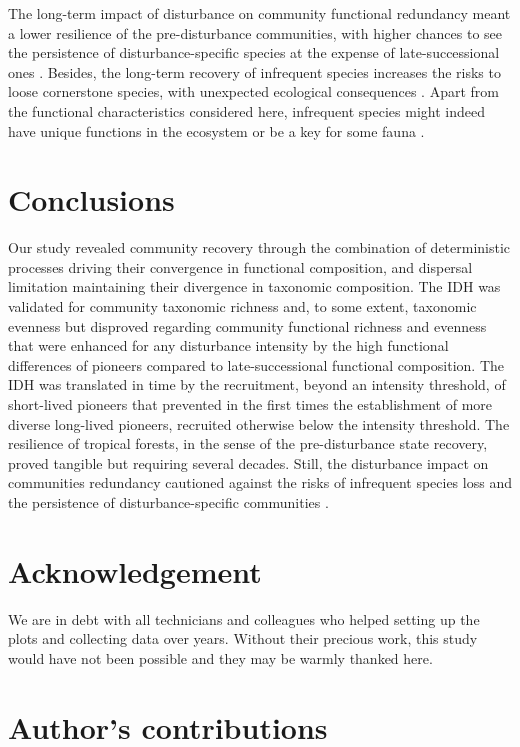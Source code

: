 \documentclass[fleqn,10pt]{ArtEcoFoG} %
\begin{document}
The long-term impact of disturbance on community functional redundancy
meant a lower resilience of the pre-disturbance communities, with higher
chances to see the persistence of disturbance-specific species at the
expense of late-successional ones \citep{Haddad2008}. Besides, the
long-term recovery of infrequent species increases the risks to loose
cornerstone species, with unexpected ecological consequences
\citep{Jones1994, Chazdon2003a, Diaz2005}. Apart from the functional
characteristics considered here, infrequent species might indeed have
unique functions in the ecosystem or be a key for some fauna
\citep{Schleuning2016}.

\section{Conclusions}\label{conclusions}

Our study revealed community recovery through the combination of
deterministic processes driving their convergence in functional
composition, and dispersal limitation maintaining their divergence in
taxonomic composition. The IDH was validated for community taxonomic
richness and, to some extent, taxonomic evenness but disproved regarding
community functional richness and evenness that were enhanced for any
disturbance intensity by the high functional differences of pioneers
compared to late-successional functional composition. The IDH was
translated in time by the recruitment, beyond an intensity threshold, of
short-lived pioneers that prevented in the first times the establishment
of more diverse long-lived pioneers, recruited otherwise below the
intensity threshold. The resilience of tropical forests, in the sense of
the pre-disturbance state recovery, proved tangible but requiring
several decades. Still, the disturbance impact on communities redundancy
cautioned against the risks of infrequent species loss and the
persistence of disturbance-specific communities \citep{Herault2018}.

\section{Acknowledgement}\label{acknowledgement}

We are in debt with all technicians and colleagues who helped setting up
the plots and collecting data over years. Without their precious work,
this study would have not been possible and they may be warmly thanked
here.

\section{Author's contributions}\label{authors-contributions}
\end{document}
